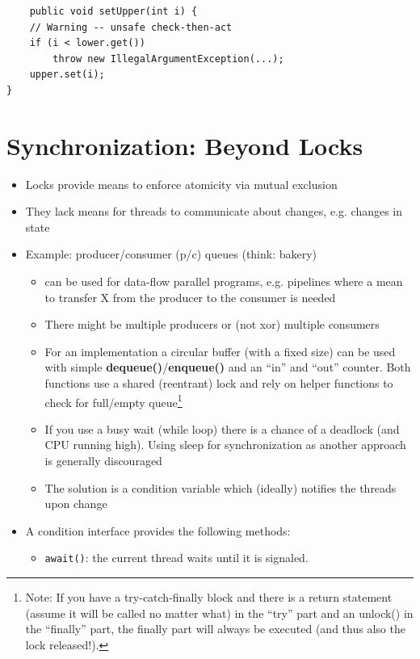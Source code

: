 \documentclass[a4paper]{article}
\newcommand{\inline}[1]{\lstinline!#1!}%
\begin{document}
\begin{itemize}
\begin{itemize}
\begin{itemize}
\begin{lstlisting}
	public void setUpper(int i) {
	// Warning -- unsafe check-then-act
	if (i < lower.get())
		throw new IllegalArgumentException(...);
	upper.set(i);
}
						\end{lstlisting}
					\end{itemize}
			\end{itemize} 
	\end{itemize}


\section{Synchronization: Beyond Locks}
\begin{itemize}
\item Locks provide means to enforce atomicity via mutual exclusion 
\item They lack means for threads to communicate about changes, e.g. changes in state
\item Example: producer/consumer (p/c) queues (think: bakery)
\begin{itemize}
\item can be used for data-flow parallel programs, e.g. pipelines where a mean to transfer X from the producer to the consumer is needed
\item There might be multiple producers or (not xor) multiple consumers
\item For an implementation a circular buffer (with a fixed size) can be used with simple \textbf{dequeue()}/\textbf{enqueue()} and an “in” and “out” counter. Both functions use a shared (reentrant) lock and rely on helper functions to check for full/empty queue\footnote{Note: If you have a try-catch-finally block and there is a return statement (assume it will be called no matter what) in the ``try'' part and an unlock() in the ``finally'' part, the finally part will always be executed (and thus also the lock released!).}
\item If you use a busy wait (while loop) there is a chance of a deadlock (and CPU running high). Using sleep for synchronization as another approach is generally discouraged
\item The solution is a condition variable which (ideally) notifies the threads upon change
\end{itemize}
\item A condition interface provides the following methods:
\begin{itemize}
\item \inline{await()}: the current thread waits until it is signaled. 

\end{itemize}
\end{itemize}
\end{document}
